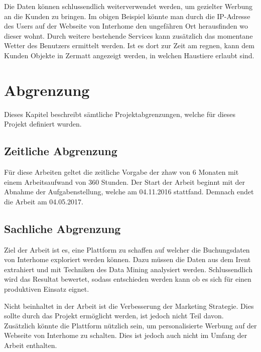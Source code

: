 Die Daten können schlussendlich weiterverwendet werden, um gezielter Werbung an die Kunden zu bringen. Im obigen Beispiel könnte man durch die IP-Adresse des Users auf der Webseite von Interhome den ungefähren Ort herausfinden wo dieser wohnt. Durch weitere bestehende Services kann zusätzlich das momentane Wetter des Benutzers ermittelt werden. Ist es dort zur Zeit am regnen, kann dem Kunden Objekte in Zermatt angezeigt werden, in welchen Haustiere erlaubt sind.


\section{Abgrenzung}
\label{sec:einleitung:abgrenzung}
Dieses Kapitel beschreibt sämtliche Projektabgrenzungen, welche für dieses Projekt definiert
wurden.

\subsection{Zeitliche Abgrenzung}
Für diese Arbeiten geltet die zeitliche Vorgabe der \gls{zhaw} von 6 Monaten mit einem Arbeitsaufwand von 360 Stunden.
Der Start der Arbeit beginnt mit der Abnahme der Aufgabenstellung, welche am 04.11.2016 stattfand.
Demnach endet die Arbeit am 04.05.2017.

\subsection{Sachliche Abgrenzung}
Ziel der Arbeit ist es, eine Plattform zu schaffen auf welcher die Buchungsdaten von Interhome exploriert werden können. Dazu müssen die Daten aus dem Irent extrahiert und mit Techniken des Data Mining analysiert werden. Schlussendlich wird das Resultat bewertet, sodass entschieden werden kann ob es sich für einen produktiven Einsatz eignet.

Nicht beinhaltet in der Arbeit ist die Verbesserung der Marketing Strategie. Dies sollte durch das Projekt ermöglicht werden, ist jedoch nicht Teil davon. Zusätzlich könnte die Plattform nützlich sein, um personalisierte Werbung auf der Webseite von Interhome zu schalten. Dies ist jedoch auch nicht im Umfang der Arbeit enthalten.


